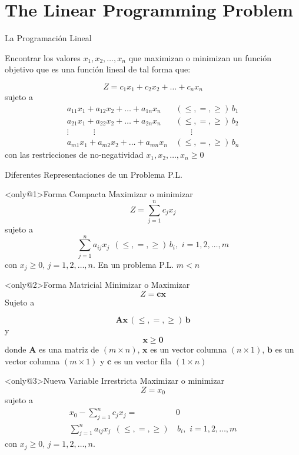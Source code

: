\section{The Linear Programming Problem}
\label{sec:lpp-problem}

\begin{frame}{La Programación Lineal}
  
  Encontrar los valores $x_1, x_2, \ldots, x_n$ que maximizan o minimizan un función objetivo que es una función lineal de tal forma que:

  \[ Z = c_1x_1 + c_2x_2 + \ldots + c_n x_n\]
  sujeto a
  \begin{align*}
    a_{11}x_1 + a_{12}x_2 +  \ldots + a_{1n}x_n & \, (\leq, =, \geq)\, b_1\\
    a_{21}x_1 + a_{22}x_2 +  \ldots + a_{2n}x_n &\, (\leq, =, \geq)\, b_2\\
    \vdots   \quad\quad\quad \vdots   \quad\quad\quad  & \quad\quad \vdots\\
    a_{m1}x_1 + a_{m2}x_2 + \ldots + a_{mn}x_n & \, (\leq, =, \geq)\, b_n
  \end{align*}
  con las restricciones de no-negatividad $x_1, x_2, \ldots, x_n \geq 0$
\end{frame}

\begin{frame}{Diferentes Representaciones de un Problema P.L.}
  
  \begin{block}<only@1>{Forma Compacta} \justifying
      Maximizar o minimizar \[ Z = \sum_{j=1}^{n} c_jx_j\]
      sujeto a \[ \sum_{j=1}^{n} a_{ij}x_j \,\; (\leq, =, \geq) \, b_i, \,\, i = 1, 2, \ldots, m \]
      con $x_j \geq 0, \, j = 1, 2, \ldots, n$. \alert{En un problema P.L. $m < n$}
    \end{block}
    
    \begin{block}<only@2>{Forma Matricial}\justifying
      Minimizar o Maximizar \[Z = \bm{cx}\]
      Sujeto a

      \[ \bm{Ax} \, (\leq, =, \geq) \, \bm{b}\]
      y \[ \bm{x} \geq \bm{0}\]
      donde $\bm{A}$ es una matriz de $(m  \times n)$, $\bm{x}$ es un vector columna $(n \times 1)$, $\bm{b}$ es un vector columna $(m \times 1)$ y $\bm{c}$ es un vector fila $(1 \times n)$
    \end{block}

      \begin{block}<only@3>{Nueva Variable Irrestricta} \justifying
      Maximizar o minimizar \[ Z = x_0\]
      sujeto a
      \begin{align*}
        x_0 - \sum_{j=1}^{n} c_jx_j =& 0\\
        \sum_{j=1}^{n} a_{ij}x_j \,\; (\leq, =, \geq)& \, b_i, \,\, i = 1, 2, \ldots, m
      \end{align*}
      con $x_j \geq 0, \, j = 1, 2, \ldots, n$. 
    \end{block}
\end{frame}



